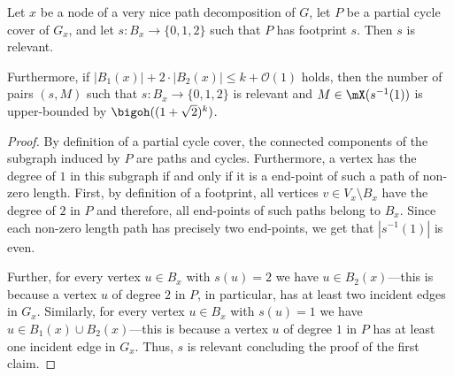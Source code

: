 \documentclass[a4paper,UKenglish,cleveref, autoref, thm-restate]{lipics-v2021}
\begin{document}
\begin{lemma}\label{lem:number-of-footprints}
	Let $x$ be a node of a very nice path decomposition of $G$, let $P$ be a partial cycle cover of $G_x$, and let $s \colon B_x \to \{0, 1, 2\}$ such that $P$ has footprint $s$. Then $s$ is relevant.
 	
 	Furthermore, if $|B_1(x)| + 2\cdot |B_2(x)| \leq k+\mathcal{O}(1)$ holds, then the number of pairs $(s, M)$ such that $s \colon B_x \to \{0, 1, 2\}$ is relevant and $M \in \mX(s^{-1}(1))$ is upper-bounded by $\bigoh((1+\sqrt{2})^k)$.
\end{lemma}

\begin{proof}
	By definition of a partial cycle cover, the connected components of the subgraph induced by $P$ are paths and cycles.
	Furthermore, a vertex has the degree of $1$ in this subgraph if and only if it is a end-point of such a path of non-zero length.
	First, by definition of a footprint, all vertices $v \in V_x \setminus B_x$ have the degree of $2$ in $P$ and therefore, all end-points of such paths belong to $B_x$.
	Since each non-zero length path has precisely two end-points, we get that $|s^{-1}(1)|$ is even.
	
	Further, for every vertex $u \in B_x$ with $s(u) = 2$ we have $u \in B_2(x)$---this is because a vertex $u$ of degree $2$ in $P$, in particular, has at least two incident edges in $G_x$.
	Similarly, for every vertex $u \in B_x$ with $s(u) = 1$ we have $u \in B_1(x) \cup B_2(x)$---this is because a vertex $u$ of degree $1$ in $P$ has at least one incident edge in $G_x$.
	Thus, $s$ is relevant concluding the proof of the first claim.
	

\end{proof}
\end{document}
